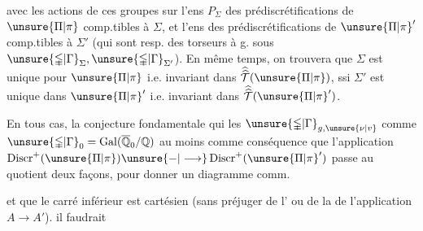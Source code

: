 
avec les actions de ces groupes sur l'ens $P_{\Sigma}$ des prédiscrétifications de $\unsure{\Pi|\pi}$ comp.tibles à $\Sigma$, et l'ens  des prédiscrétifications de $\unsure{\Pi|\pi}'$ comp.tibles à $\Sigma'$ (qui sont resp. des torseurs à g. sous $\unsure{\mathbb{\Gamma}|\Gamma}_{\Sigma},\unsure{\mathbb{\Gamma}|\Gamma}_{\Sigma'}$). En même temps, on trouvera  que $\Sigma$ est unique pour $\unsure{\Pi|\pi}$ i.e. invariant dans $\widehat{\widehat{\mathcal T}}(\unsure{\Pi|\pi})$, ssi $\Sigma'$ est unique dans $\unsure{\Pi|\pi}'$ i.e. invariant dans $\widehat{\widehat{\mathcal T}}(\unsure{\Pi|\pi}')$.

En tous cas, la conjecture fondamentale qui  les $\unsure{\mathbb{\Gamma}|\Gamma}_{g,\unsure{\nu|v}}$ comme $\unsure{\mathbb{\Gamma}|\Gamma}_0=\operatorname{Gal}(\overline{\mathbb Q}_0/\mathbb Q)$  au moins comme conséquence que l'application $\operatorname{Discr}^{+}(\unsure{\Pi|\pi})\unsure{-|\longrightarrow}\operatorname{Discr}^{+}(\unsure{\Pi|\pi}')$ passe au quotient  deux façons, pour donner un diagramme comm.


et que le  carré inférieur est cartésien (sans préjuger de l' ou de la  de l'application $A\longrightarrow A'$).  il faudrait

